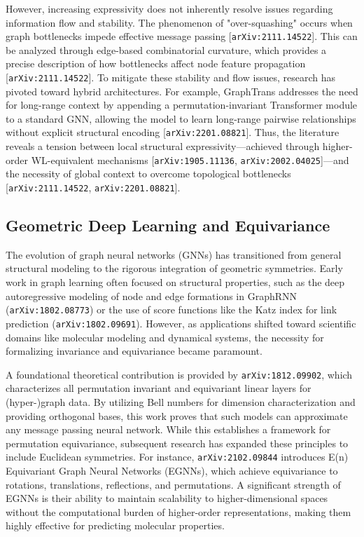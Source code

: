 \documentclass[11pt]{article}
\begin{document}
However, increasing expressivity does not inherently resolve issues regarding information flow and stability. The phenomenon of "over-squashing" occurs when graph bottlenecks impede effective message passing [\texttt{arXiv:2111.14522}]. This can be analyzed through edge-based combinatorial curvature, which provides a precise description of how bottlenecks affect node feature propagation [\texttt{arXiv:2111.14522}]. To mitigate these stability and flow issues, research has pivoted toward hybrid architectures. For example, GraphTrans addresses the need for long-range context by appending a permutation-invariant Transformer module to a standard GNN, allowing the model to learn long-range pairwise relationships without explicit structural encoding [\texttt{arXiv:2201.08821}]. Thus, the literature reveals a tension between local structural expressivity—achieved through higher-order WL-equivalent mechanisms [\texttt{arXiv:1905.11136}, \texttt{arXiv:2002.04025}]—and the necessity of global context to overcome topological bottlenecks [\texttt{arXiv:2111.14522}, \texttt{arXiv:2201.08821}].

\subsection{Geometric Deep Learning and Equivariance}

The evolution of graph neural networks (GNNs) has transitioned from general structural modeling to the rigorous integration of geometric symmetries. Early work in graph learning often focused on structural properties, such as the deep autoregressive modeling of node and edge formations in GraphRNN (\texttt{arXiv:1802.08773}) or the use of score functions like the Katz index for link prediction (\texttt{arXiv:1802.09691}). However, as applications shifted toward scientific domains like molecular modeling and dynamical systems, the necessity for formalizing invariance and equivariance became paramount.

A foundational theoretical contribution is provided by \texttt{arXiv:1812.09902}, which characterizes all permutation invariant and equivariant linear layers for (hyper-)graph data. By utilizing Bell numbers for dimension characterization and providing orthogonal bases, this work proves that such models can approximate any message passing neural network. While this establishes a framework for permutation equivariance, subsequent research has expanded these principles to include Euclidean symmetries. For instance, \texttt{arXiv:2102.09844} introduces E(n) Equivariant Graph Neural Networks (EGNNs), which achieve equivariance to rotations, translations, reflections, and permutations. A significant strength of EGNNs is their ability to maintain scalability to higher-dimensional spaces without the computational burden of higher-order representations, making them highly effective for predicting molecular properties.
\end{document}
